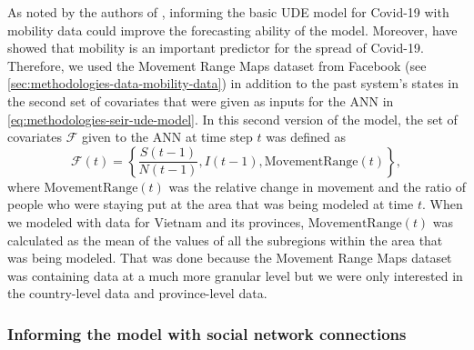 As noted by the authors of \cite{dandekarMachineLearningAidedGlobal2020a}, informing the basic \gls{UDE} model for Covid-19 with mobility data could improve the forecasting ability of the model.
Moreover, \cite{changMobilityNetworkModels2021,ihmecovid-19forecastingteamModelingCOVID19Scenarios2021,liSubstantialUndocumentedInfection2020} have showed that mobility is an important predictor for the spread of Covid-19.
Therefore, we used the Movement Range Maps dataset from Facebook (see \autoref{sec:methodologies-data-mobility-data}) in addition to the past system's states in the second set of covariates that were given as inputs for the \gls{ANN} in \autoref{eq:methodologies-seir-ude-model}.
In this second version of the model, the set of covariates $\mathcal{F}$ given to the \gls{ANN} at time step $t$ was defined as
\begin{equation*}
    \mathcal{F}(t) = \left\lbrace \frac{S(t-1)}{N(t-1)}, I(t-1), \text{MovementRange}(t) \right\rbrace,
\end{equation*}
where $\text{MovementRange}(t)$ was the relative change in movement and the ratio of people who were staying put at the area that was being modeled at time $t$.
When we modeled with data for Vietnam and its provinces, $\text{MovementRange}(t)$ was calculated as the mean of the values of all the subregions within the area that was being modeled.
That was done because the Movement Range Maps dataset was containing data at a much more granular level but we were only interested in the country-level data and province-level data.

\subsubsection{Informing the model with social network connections}

